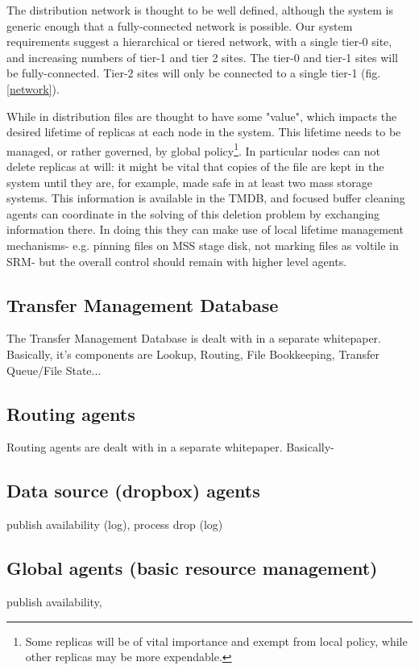 \documentclass{cmspaper}
\begin{document}
The distribution network is thought to be well defined, although the system is generic enough that a fully-connected network is possible. Our system requirements suggest a hierarchical or tiered network, with a single tier-0 site, and increasing numbers of tier-1 and tier 2 sites. The tier-0 and tier-1 sites will be fully-connected. Tier-2 sites will only be connected to a single tier-1 (fig. \ref{network}).

While in distribution files are thought to have some "value", which impacts the desired lifetime of replicas at each node in the system. This lifetime needs to be managed, or rather governed, by global policy\footnote{Some replicas will be of vital importance and exempt from local policy, while other replicas may be more expendable.}. In particular nodes can not delete replicas at will: it might be vital that copies of the file are kept in the system until they are, for example, made safe in at least two mass storage systems. This information is available in the TMDB, and focused buffer cleaning agents can coordinate in the solving of this deletion problem by exchanging information there. In doing this they can make use of local lifetime management mechanisms- e.g. pinning files on MSS stage disk, not marking files as voltile in SRM- but the overall control should remain with higher level agents.

\subsection{Transfer Management Database}
The Transfer Management Database is dealt with in a separate whitepaper. Basically, it's components are Lookup, Routing, File Bookkeeping, Transfer Queue/File State...

\subsection{Routing agents}
Routing agents are dealt with in a separate whitepaper. Basically-

\subsection{Data source (dropbox) agents}
publish availability (log), process drop (log)

\subsection{Global agents (basic resource management)}
publish availability,
\end{document}
